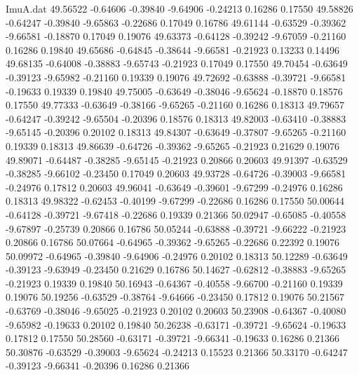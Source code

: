 \begin{filecontents}{ImuA.dat}
  49.56522   -0.64606   -0.39840   -9.64906   -0.24213    0.16286    0.17550
  49.58826   -0.64247   -0.39840   -9.65863   -0.22686    0.17049    0.16786
  49.61144   -0.63529   -0.39362   -9.66581   -0.18870    0.17049    0.19076
  49.63373   -0.64128   -0.39242   -9.67059   -0.21160    0.16286    0.19840
  49.65686   -0.64845   -0.38644   -9.66581   -0.21923    0.13233    0.14496
  49.68135   -0.64008   -0.38883   -9.65743   -0.21923    0.17049    0.17550
  49.70454   -0.63649   -0.39123   -9.65982   -0.21160    0.19339    0.19076
  49.72692   -0.63888   -0.39721   -9.66581   -0.19633    0.19339    0.19840
  49.75005   -0.63649   -0.38046   -9.65624   -0.18870    0.18576    0.17550
  49.77333   -0.63649   -0.38166   -9.65265   -0.21160    0.16286    0.18313
  49.79657   -0.64247   -0.39242   -9.65504   -0.20396    0.18576    0.18313
  49.82003   -0.63410   -0.38883   -9.65145   -0.20396    0.20102    0.18313
  49.84307   -0.63649   -0.37807   -9.65265   -0.21160    0.19339    0.18313
  49.86639   -0.64726   -0.39362   -9.65265   -0.21923    0.21629    0.19076
  49.89071   -0.64487   -0.38285   -9.65145   -0.21923    0.20866    0.20603
  49.91397   -0.63529   -0.38285   -9.66102   -0.23450    0.17049    0.20603
  49.93728   -0.64726   -0.39003   -9.66581   -0.24976    0.17812    0.20603
  49.96041   -0.63649   -0.39601   -9.67299   -0.24976    0.16286    0.18313
  49.98322   -0.62453   -0.40199   -9.67299   -0.22686    0.16286    0.17550
  50.00644   -0.64128   -0.39721   -9.67418   -0.22686    0.19339    0.21366
  50.02947   -0.65085   -0.40558   -9.67897   -0.25739    0.20866    0.16786
  50.05244   -0.63888   -0.39721   -9.66222   -0.21923    0.20866    0.16786
  50.07664   -0.64965   -0.39362   -9.65265   -0.22686    0.22392    0.19076
  50.09972   -0.64965   -0.39840   -9.64906   -0.24976    0.20102    0.18313
  50.12289   -0.63649   -0.39123   -9.63949   -0.23450    0.21629    0.16786
  50.14627   -0.62812   -0.38883   -9.65265   -0.21923    0.19339    0.19840
  50.16943   -0.64367   -0.40558   -9.66700   -0.21160    0.19339    0.19076
  50.19256   -0.63529   -0.38764   -9.64666   -0.23450    0.17812    0.19076
  50.21567   -0.63769   -0.38046   -9.65025   -0.21923    0.20102    0.20603
  50.23908   -0.64367   -0.40080   -9.65982   -0.19633    0.20102    0.19840
  50.26238   -0.63171   -0.39721   -9.65624   -0.19633    0.17812    0.17550
  50.28560   -0.63171   -0.39721   -9.66341   -0.19633    0.16286    0.21366
  50.30876   -0.63529   -0.39003   -9.65624   -0.24213    0.15523    0.21366
  50.33170   -0.64247   -0.39123   -9.66341   -0.20396    0.16286    0.21366

\end{filecontents}
